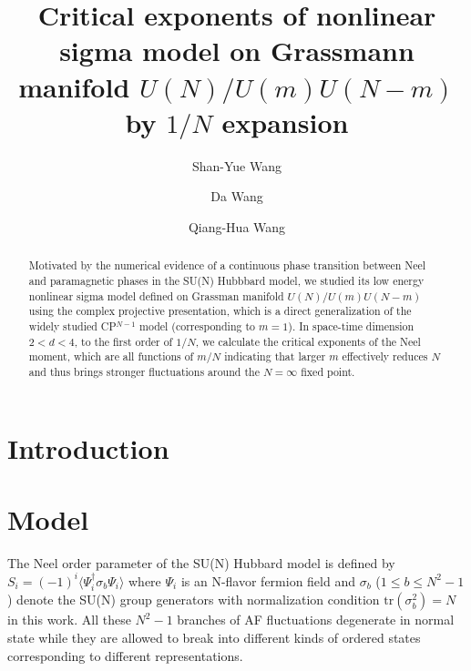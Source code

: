 \documentclass[aps,preprint,superscriptaddress]{revtex4-1}
\begin{document}
\title{Critical exponents of nonlinear sigma model on Grassmann manifold $U(N)/U(m)U(N-m)$ by $1/N$ expansion}
\author{Shan-Yue Wang}
\author{Da Wang}
\author{Qiang-Hua Wang}
\begin{abstract}
  Motivated by the numerical evidence of a continuous phase transition between Neel and paramagnetic phases in the SU(N) Hubbbard model, we studied its low energy nonlinear sigma model defined on Grassman manifold $U(N)/U(m)U(N-m)$ using the complex projective presentation, which is a direct generalization of the widely studied CP$^{N-1}$ model (corresponding to $m=1$). In space-time dimension $2<d<4$, to the first order of $1/N$, we calculate the critical exponents of the Neel moment, which are all functions of $m/N$ indicating that larger $m$ effectively reduces $N$ and thus brings stronger fluctuations around the $N=\infty$ fixed point. 
\end{abstract}
\maketitle

\section{Introduction}

\section{Model}
The Neel order parameter of the SU(N) Hubbard model is defined by $S_i=(-1)^i\langle \Psi_i^\dagger \sigma_b \Psi_i\rangle$ where $\Psi_i$ is an N-flavor fermion field and $\sigma_b$ ($1\le b\le N^2-1$) denote the SU(N) group generators with normalization condition $\mathrm{tr}(\sigma_b^2)=N$ in this work. All these $N^2-1$ branches of AF fluctuations degenerate in normal state while they are allowed to break into different kinds of ordered states corresponding to different representations.
\end{document}
